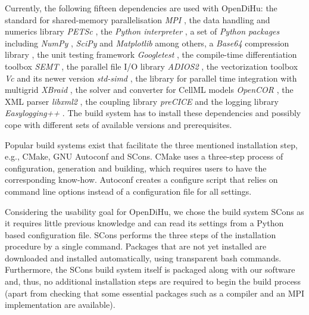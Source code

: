 Currently, the following fifteen dependencies are used with OpenDiHu: the standard for shared-memory parallelisation \emph{MPI} \cite{openmpi}, the data handling and numerics library \emph{PETSc} \cite{petsc-efficient1997,petsc-user-ref,petsc-web-page}, the \emph{Python interpreter} \cite{python3}, a set of \emph{Python packages} including \emph{NumPy} \cite{numpy}, \emph{SciPy} \cite{scipy} and \emph{Matplotlib} \cite{matplotlib} among others, a \emph{Base64} compression library \cite{base64}, the unit testing framework \emph{Googletest} \cite{googletest}, the compile-time differentiation toolbox \emph{SEMT} \cite{gutterman2004symbolic,semt}, the parallel file I/O library \emph{ADIOS2} \cite{adios2}, the vectorization toolbox \emph{Vc} \cite{vc2012,Kretz2015} and its newer version \emph{std-simd} \cite{hoberock2016working}, the library for parallel time integration with multigrid \emph{XBraid} \cite{xbraid-package}, the solver and converter for CellML models \emph{OpenCOR} \cite{OpenCOR2015}, the XML parser \emph{libxml2} \cite{libxml2}, the coupling library \emph{preCICE} \cite{precice} and the logging library \emph{Easylogging++} \cite{easyloggingpp}. The build system has to install these dependencies and possibly cope with different sets of available versions and prerequisites.


Popular build systems exist that facilitate the three mentioned installation step, e.g., CMake, GNU Autoconf and SCons. CMake uses a three-step process of configuration, generation and building, which requires users to have the corresponding know-how. Autoconf creates a configure script that relies on command line options instead of a configuration file for all settings. 

Considering the usability goal for OpenDiHu, we chose the build system SCons as it requires little previous knowledge and can read its settings from a Python based configuration file. SCons performs the three steps of the installation procedure by a single command. Packages that are not yet installed are downloaded and installed automatically, using transparent bash commands.
Furthermore, the SCons build system itself is packaged along with our software and, thus, no additional installation steps are required to begin the build process (apart from checking that some essential packages such as a compiler and an MPI implementation are available).


